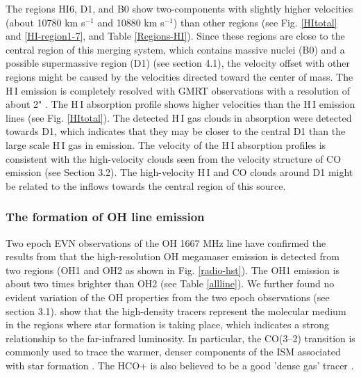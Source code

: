 \documentclass[]{aa} %
\newcommand{\kms}{km s$^{-1}$\xspace}
\newcommand{\HI}{{\rm H\,{\scriptsize I}}\xspace}
\begin{document}
The regions HI6, D1, and B0 show two-components with slightly higher velocities (about 10780 \kms and 10880 \kms) than other regions (see Fig. \ref{HItotal} and \ref{HI-region1-7}, and Table \ref{Regions-HI}). Since these regions are close to the central region of this merging system, which contains massive nuclei (B0) and a possible supermassive region (D1) (see section 4.1), the velocity offset with other regions might be caused by the velocities directed toward the center of mass. The \HI emission is completely resolved with GMRT observations with a resolution of about 2" \citep{2019MNRAS.489.1099D}. The \HI absorption profile shows higher velocities than the \HI emission lines (see Fig. \ref{HItotal}). The detected \HI gas clouds in absorption were detected towards D1, which indicates that they may be closer to the central D1 than the large scale \HI gas in emission.
The velocity of the \HI absorption profiles is consistent with the high-velocity clouds seen from the velocity structure of CO emission (see Section 3.2). The high-velocity \HI and CO clouds around D1 might be related to the inflows towards the central region of this source.


\subsubsection{The formation of OH line emission}

Two epoch EVN observations of the OH 1667 MHz line have confirmed the results from \cite{2010PhDT.......280C} that the high-resolution OH megamaser emission is detected from two regions (OH1 and OH2 as shown in Fig. \ref{radio-hst}). The OH1 emission is about two times brighter than OH2 (see Table \ref{allline}). We further found no evident variation of the OH properties from the two epoch observations (see section 3.1).
\cite{2008A&A...477..747B} show that the high-density tracers represent the molecular medium in the regions where star formation is taking place, which indicates a strong relationship to the far-infrared luminosity. In particular, the CO(3–2) transition is commonly used to trace the warmer, denser components of the ISM associated with star formation \citep{2010MNRAS.406.1364L}. The HCO+ is also believed to be a good 'dense gas' tracer \citep{2020MNRAS.499....1F}.
\end{document}
